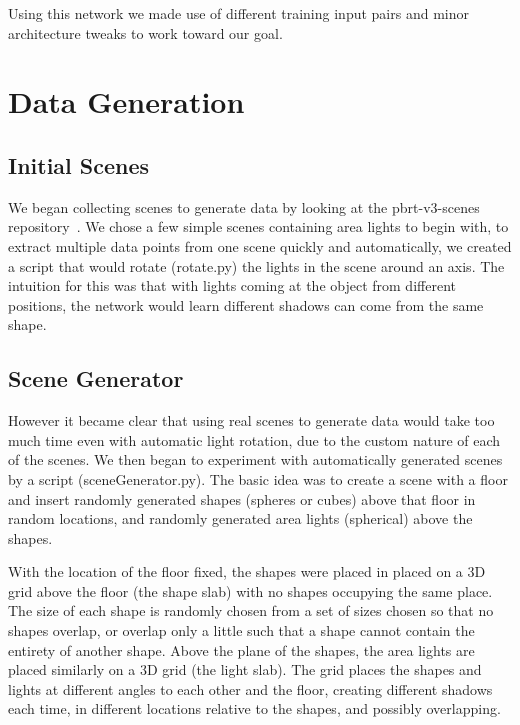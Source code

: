 \documentclass[acmsmall]{acmart}
\begin{document}
Using this network we made use of different training input pairs and minor architecture tweaks to work toward our goal.

\section{Data Generation}
\label{sec:datagen}

\subsection{Initial Scenes}
\label{subsec:initScenes}

We began collecting scenes to generate data by looking at the pbrt-v3-scenes repository~\cite{scenes}. We chose a few simple scenes containing area lights to begin with, to extract multiple data points from one scene quickly and automatically, we created a script that would rotate (rotate.py) the lights in the scene around an axis. The intuition for this was that with lights coming at the object from different positions, the network would learn different shadows can come from the same shape.

\subsection{Scene Generator}
\label{subsec:sceneGen}

However it became clear that using real scenes to generate data would take too much time even with automatic light rotation, due to the custom nature of each of the scenes. We then began to experiment with automatically generated scenes by a script (sceneGenerator.py). The basic idea was to create a scene with a floor and insert randomly generated shapes (spheres or cubes) above that floor in random locations, and randomly generated area lights (spherical) above the shapes.

With the location of the floor fixed, the shapes were placed in placed on a 3D grid above the floor (the shape slab) with no shapes occupying the same place. The size of each shape is randomly chosen from a set of sizes chosen so that no shapes overlap, or overlap only a little such that a shape cannot contain the entirety of another shape. Above the plane of the shapes, the area lights are placed similarly on a 3D grid (the light slab). The grid places the shapes and lights at different angles to each other and the floor, creating different shadows each time, in different locations relative to the shapes, and possibly overlapping.
\end{document}
